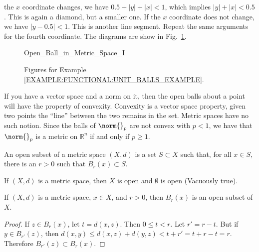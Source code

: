\documentclass[crop=false,class=book,oneside]{standalone}                      %
\begin{document}
\begin{example}
            the $x$ coordinate changes, we have
            $0.5+|y|+|x|<1$, which implies
            $|y|+|x|<0.5$. This is again a diamond, but a
            smaller one. If the $x$ coordinate does not
            change, we have $|y-0.5|<1$. This is another
            line segment. Repeat the same arguments for the
            fourth coordinate. The diagrams are show in
            Fig.~\ref{FUNCTIONAL:HOMEWORK:2:PROBLEM:4:FIGURES}.
        \begin{figure}[H]
            \centering
            \captionsetup{type=figure}
            {Open_Ball_in_Metric_Space_I}
            \caption{Figures for Example
                     \ref{EXAMPLE:FUNCTIONAL:UNIT_BALLS_EXAMPLE}.}
            \label{FUNCTIONAL:HOMEWORK:2:PROBLEM:4:FIGURES}
        \end{figure}
            \end{example}
            If you have a vector space and a norm on it,
            then the open balls about a point will have the
            property of convexity. Convexity is a vector space
            property, given two points the ``line'' between the
            two remains in the set. Metric spaces have no such
            notion. Since the balls of $\norm{}_{p}$ are not
            convex with $p<1$, we have that $\norm{}_{p}$ is
            a metric on $\mathbb{R}^{n}$
            if and only if $p\geq{1}$.
            \begin{definition}
                An open subset of a metric space
                $(X,d)$ is a set $S\subset{X}$ such that,
                for all $x\in{S}$, there is an
                $r>0$ such that
                $B_{r}(x)\subset{S}$.
            \end{definition}
            \begin{example}
                If $(X,d)$ is a metric space, then
                $X$ is open and $\emptyset$ is open
                (Vacuously true).
            \end{example}
            \begin{theorem}
                If $(X,d)$ is a metric space, $x\in{X}$,
                and $r>0$, then $B_{r}(x)$ is an open
                subset of $X$.
            \end{theorem}
            \begin{proof}
                If $z\in{B_{r}(x)}$, let $t=d(x,z)$.
                Then $0\leq{t}<r$. Let $r'=r-t$.
                But if $y\in{B_{r'}(z)}$, then
                $d(x,y)\leq{d(x,z)+d(y,z)}<t+r'=t+r-t=r$.
                Therefore $B_{r'}(z)\subset{B_{r}(x)}$.
            \end{proof}
\end{document}
